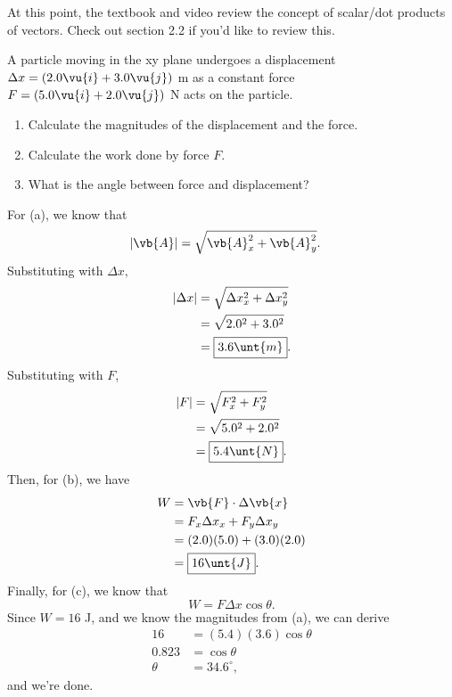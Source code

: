 \documentclass[11pt]{article}
\begin{document}
\begin{remark}
	At this point, the textbook and video review the concept of scalar/dot products of vectors. Check out section 2.2 if you'd like to review this.
\end{remark}

\begin{example}
	A particle moving in the xy plane undergoes a displacement $\Delta x = (2.0\vu{i} + 3.0\vu{j})$ m as a constant force $F = (5.0\vu{i} + 2.0 \vu{j})$ N acts on the particle.
	\begin{enumerate}[label=\alph*)]
		\item Calculate the magnitudes of the displacement and the force.
		\item Calculate the work done by force $F$.
		\item What is the angle between force and displacement?
	\end{enumerate}
\end{example}
\begin{solution}
	For (a), we know that
	\begin{align*}
		|\vb{A}| &= \sqrt{\vb{A}_x^2 + \vb{A}_y^2}.
	\end{align*}
	Substituting with $\Delta x,$
	\begin{align*}
		|\Delta x| &= \sqrt{\Delta x_x^2 + \Delta x_y^2} \\
		&= \sqrt{2.0^2 + 3.0^2} \\
		&= \boxed{3.6 \unt{m}}.
	\end{align*}
	Substituting with $F$,
	\begin{align*}
		|F| &= \sqrt{F_x^2 + F_y^2} \\
		&= \sqrt{5.0^2 + 2.0^2} \\
		&= \boxed{5.4 \unt{N}}.
	\end{align*}
	Then, for (b), we have
	\begin{align*}
		W &= \vb{F}\cdot\Delta \vb{x} \\
		&= F_x\Delta x_x + F_y\Delta x_y \\
		&= (2.0)(5.0) + (3.0)(2.0) \\
		&= \boxed{16 \unt{J}}.
	\end{align*}
	Finally, for (c), we know that
	\[W = F\Delta x\cos\theta.\]
	Since $W = 16$ J, and we know the magnitudes from (a), we can derive
	\begin{align*}
		16 &= (5.4)(3.6)\cos\theta \\
		0.823 &= \cos\theta \\
		\theta &= \boxed{34.6^{\circ}},
	\end{align*}
	and we're done.
\end{solution}
\end{document}
